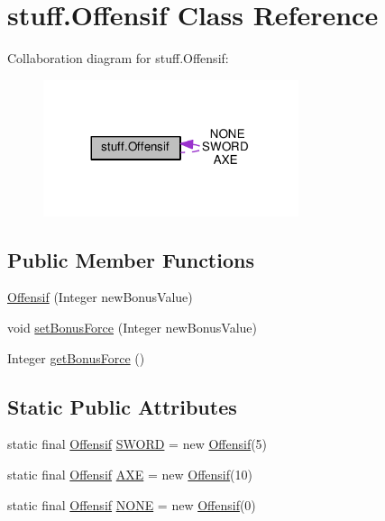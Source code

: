 \hypertarget{classstuff_1_1_offensif}{}\section{stuff.\+Offensif Class Reference}
\label{classstuff_1_1_offensif}


Collaboration diagram for stuff.\+Offensif\+:\nopagebreak
\begin{figure}[H]
\begin{center}
\leavevmode
\includegraphics[width=212pt]{classstuff_1_1_offensif__coll__graph}
\end{center}
\end{figure}
\subsection*{Public Member Functions}
\begin{DoxyCompactItemize}
\item 
\hyperlink{classstuff_1_1_offensif_a84cb1366e21433f8e80c2272805fae71}{Offensif} (Integer new\+Bonus\+Value)
\item 
void \hyperlink{classstuff_1_1_offensif_abca13eb0c8696a36ae66c80c6d655902}{set\+Bonus\+Force} (Integer new\+Bonus\+Value)
\item 
Integer \hyperlink{classstuff_1_1_offensif_a263d0110fb8636758fa29eed09dba3f7}{get\+Bonus\+Force} ()
\end{DoxyCompactItemize}
\subsection*{Static Public Attributes}
\begin{DoxyCompactItemize}
\item 
static final \hyperlink{classstuff_1_1_offensif}{Offensif} \hyperlink{classstuff_1_1_offensif_a68a5dd4dd902fea924cc35f037bc0e0f}{S\+W\+O\+RD} = new \hyperlink{classstuff_1_1_offensif}{Offensif}(5)
\item 
static final \hyperlink{classstuff_1_1_offensif}{Offensif} \hyperlink{classstuff_1_1_offensif_aafe94486ee9575a68c626d86fe106bc1}{A\+XE} = new \hyperlink{classstuff_1_1_offensif}{Offensif}(10)
\item 
static final \hyperlink{classstuff_1_1_offensif}{Offensif} \hyperlink{classstuff_1_1_offensif_a48102b95df38b36febf913294ba342ae}{N\+O\+NE} = new \hyperlink{classstuff_1_1_offensif}{Offensif}(0)
\end{DoxyCompactItemize}


